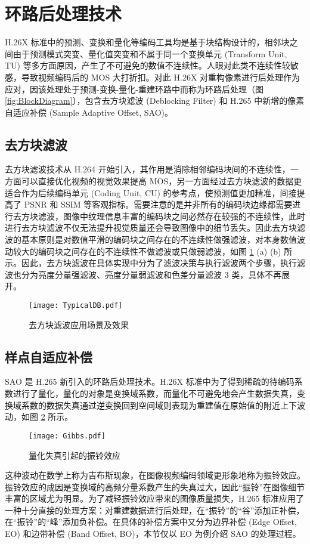 \section{环路后处理技术}
H.26X 标准中的预测、变换和量化等编码工具均是基于块结构设计的，相邻块之间由于预测模式突变、量化值突变和不属于同一个变换单元 (Transform Unit, TU) 等多方面原因，产生了不可避免的数值不连续性。人眼对此类不连续性较敏感，导致视频编码后的 MOS 大打折扣。对此 H.26X 对重构像素进行后处理作为应对，因该处理处于预测-变换-量化-重建环路中而称为环路后处理（图 \ref{fig:BlockDiagram}），包含去方块滤波 (Deblocking Filter) 和 H.265 中新增的像素自适应补偿 (Sample Adaptive Offset, SAO)。
\subsection{去方块滤波}
去方块滤波技术从 H.264 开始引入，其作用是消除相邻编码块间的不连续性，一方面可以直接优化视频的视觉效果提高 MOS，另一方面经过去方块滤波的数据更适合作为后续编码单元 (Coding Unit, CU) 的参考点，使预测值更加精准，间接提高了 PSNR 和 SSIM 等客观指标。需要注意的是并非所有的编码块边缘都需要进行去方块滤波，图像中纹理信息丰富的编码块之间必然存在较强的不连续性，此时进行去方块滤波不仅无法提升视觉质量还会导致图像中的细节丢失。因此去方块滤波的基本原则是对数值平滑的编码块之间存在的不连续性做强滤波，对本身数值波动较大的编码块之间存在的不连续性不做滤波或只做弱滤波，如图 \ref{fig:TypicalDB} (a) (b) 所示。因此，去方块滤波在具体实现中分为了滤波决策与执行滤波两个步骤，执行滤波也分为亮度分量强滤波、亮度分量弱滤波和色差分量滤波 3 类，具体不再展开。
\begin{figure}[hbt]
    \centering
    \texttt{[image: TypicalDB.pdf]}
    \caption{去方块滤波应用场景及效果}
    \label{fig:TypicalDB}
\end{figure}

\subsection{样点自适应补偿}
SAO 是 H.265 新引入的环路后处理技术。H.26X 标准中为了得到稀疏的待编码系数进行了量化，量化的对象是变换域系数，而量化不可避免地会产生数据失真，变换域系数的数据失真通过逆变换回到空间域则表现为重建值在原始值的附近上下波动，如图 \ref{fig:Gibbs} 所示。
\begin{figure}[hbt]
    \centering
    \texttt{[image: Gibbs.pdf]}
    \caption{量化失真引起的振铃效应}
    \label{fig:Gibbs}
\end{figure}

这种波动在数学上称为吉布斯现象，在图像视频编码领域更形象地称为振铃效应。振铃效应的成因是变换域的高频分量系数产生的失真过大，因此“振铃”在图像细节丰富的区域尤为明显。为了减轻振铃效应带来的图像质量损失，H.265 标准应用了一种十分直接的处理方案：对重建数据进行后处理，在“振铃”的“谷”添加正补偿，在“振铃”的“峰”添加负补偿。在具体的补偿方案中又分为边界补偿 (Edge Offset, EO) 和边带补偿 (Band Offset, BO)，本节仅以 EO 为例介绍 SAO 的处理过程。

